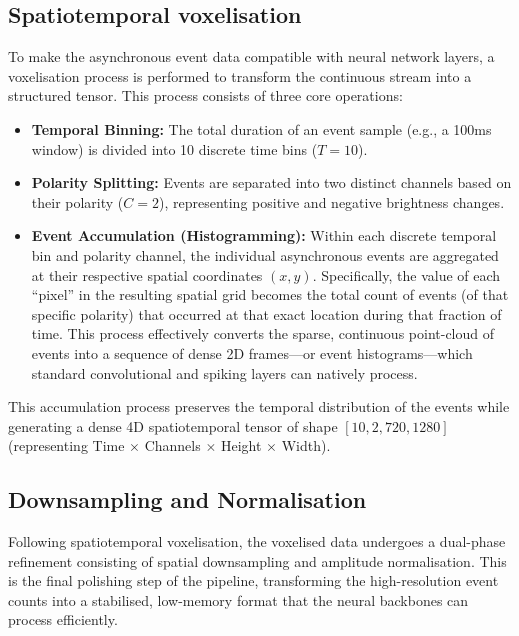 \subsection{Spatiotemporal voxelisation}

To make the asynchronous event data compatible with neural network layers, a voxelisation process is performed to transform the continuous stream into a structured tensor. This process consists of three core operations:

\begin{itemize}
    \item \textbf{Temporal Binning:} The total duration of an event sample (e.g., a 100ms window) is divided into 10 discrete time bins ($T=10$).
    \item \textbf{Polarity Splitting:} Events are separated into two distinct channels based on their polarity ($C=2$), representing positive and negative brightness changes.
    \item \textbf{Event Accumulation (Histogramming):} Within each discrete temporal bin and polarity channel, the individual asynchronous events are aggregated at their respective spatial coordinates $(x,y)$. Specifically, the value of each ``pixel'' in the resulting spatial grid becomes the total count of events (of that specific polarity) that occurred at that exact location during that fraction of time. This process effectively converts the sparse, continuous point-cloud of events into a sequence of dense 2D frames---or event histograms---which standard convolutional and spiking layers can natively process.
\end{itemize}

This accumulation process preserves the temporal distribution of the events while generating a dense 4D spatiotemporal tensor of shape $[10, 2, 720, 1280]$ (representing Time $\times$ Channels $\times$ Height $\times$ Width).

\subsection{Downsampling and Normalisation}
Following spatiotemporal voxelisation, the voxelised data undergoes a dual-phase refinement consisting of spatial downsampling and amplitude normalisation. 
This is the final polishing step of the pipeline, transforming the high-resolution event counts into a stabilised, low-memory format that the neural backbones can process efficiently.

